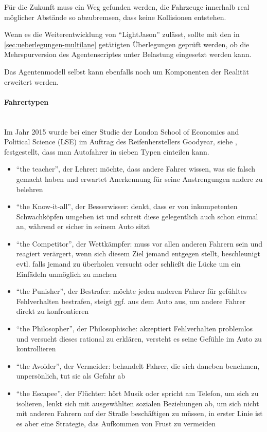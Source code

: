 Für die Zukunft muss ein Weg gefunden werden, die Fahrzeuge innerhalb real möglicher Abstände so abzubremsen, dass keine Kollisionen entstehen. 

Wenn es die Weiterentwicklung von \enquote{LightJason} zulässt, sollte mit den in \cref{sec:ueberlegungen-multilane} getätigten Überlegungen geprüft werden, ob die Mehrspurversion des Agentenscriptes unter Belastung eingesetzt werden kann.

Das Agentenmodell selbst kann ebenfalls noch um Komponenten der Realität erweitert werden.

\paragraph*{Fahrertypen}
\hfill \\
Im Jahr 2015 wurde bei einer Studie der London School of Economics and Political Science (LSE) im Auftrag des Reifenherstellers Goodyear, siehe \cite{fahrertyp}, festgestellt, dass man Autofahrer in sieben Typen einteilen kann.
\begin{itemize}
\itemsep0em
	\item \enquote{the teacher}, der Lehrer: möchte, dass andere Fahrer wissen, was sie falsch gemacht haben und erwartet Anerkennung für seine Anstrengungen andere zu belehren
	\item \enquote{the Know-it-all}, der Besserwisser: denkt, dass er von inkompetenten Schwachköpfen umgeben ist und schreit diese gelegentlich auch schon einmal an, während er sicher in seinem Auto sitzt
	\item \enquote{the Competitor}, der Wettkämpfer: muss vor allen anderen Fahrern sein und reagiert verärgert, wenn sich diesem Ziel jemand entgegen stellt, beschleunigt evtl. falls jemand zu überholen versucht oder schließt die Lücke um ein Einfädeln unmöglich zu machen
	\item \enquote{the Punisher}, der Bestrafer: möchte jeden anderen Fahrer für gefühltes Fehlverhalten bestrafen, steigt ggf. aus dem Auto aus, um andere Fahrer direkt zu konfrontieren
	\item \enquote{the Philosopher}, der Philosophische: akzeptiert Fehlverhalten problemlos und versucht dieses rational zu erklären, versteht es seine Gefühle im Auto zu kontrollieren
	\item \enquote{the Avoider}, der Vermeider: behandelt Fahrer, die sich daneben benehmen, unpersönlich, tut sie als Gefahr ab
	\item \enquote{the Escapee}, der Flüchter: hört Musik oder spricht am Telefon, um sich zu isolieren, lenkt sich mit ausgewählten sozialen Beziehungen ab, um sich nicht mit anderen Fahrern auf der Straße beschäftigen zu müssen, in erster Linie ist es aber eine Strategie, das Aufkommen von Frust zu vermeiden
\end{itemize}

